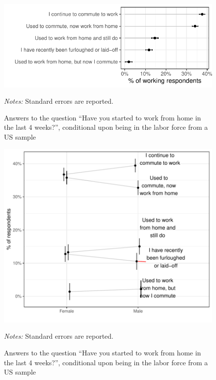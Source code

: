 \documentclass[12pt]{article}
\begin{document}
\begin{figure}
  \caption{Answers to the question ``Have you started to work from home in the last 4 weeks?'', conditional upon being in the labor force from a US sample} \label{fig:working_summary}
\centering
\begin{minipage}{1.0 \linewidth}
  \includegraphics[width = \linewidth]{plots/working_summary.pdf} \\
  \begin{footnotesize}
    \begin{singlespace}
      \emph{Notes:} Standard errors are reported. 
    \end{singlespace}
    \end{footnotesize}
\end{minipage}
\end{figure} 




\begin{figure}
  \caption{Answers to the question ``Have you started to work from home in the last 4 weeks?'', conditional upon being in the labor force from a US sample} \label{fig:gender}
\centering
\begin{minipage}{1.0 \linewidth}
  \includegraphics[width = \linewidth]{plots/gender.pdf} \\
  \begin{footnotesize}
    \begin{singlespace}
      \emph{Notes:} Standard errors are reported. 
    \end{singlespace}
    \end{footnotesize}
\end{minipage}
\end{figure} 



\newpage \clearpage


\end{document}
